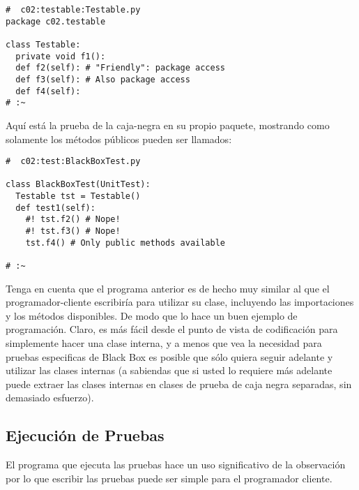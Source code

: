 \begin{lstlisting}
#  c02:testable:Testable.py 
package c02.testable 

class Testable: 
  private void f1(): 
  def f2(self): # "Friendly": package access 
  def f3(self): # Also package access 
  def f4(self): 
# :~ 
\end{lstlisting}

Aquí está la prueba de la caja-negra en su propio paquete, mostrando como solamente los métodos públicos pueden ser llamados:   \newline  \newline

\begin{lstlisting}
#  c02:test:BlackBoxTest.py 

class BlackBoxTest(UnitTest): 
  Testable tst = Testable() 
  def test1(self): 
    #! tst.f2() # Nope! 
    #! tst.f3() # Nope! 
    tst.f4() # Only public methods available 
    
# :~ 
\end{lstlisting}

Tenga en cuenta que el programa anterior es de hecho muy similar al que el programador-cliente escribiría para utilizar su clase, incluyendo las importaciones y los métodos disponibles. De modo que lo hace un buen ejemplo de programación. Claro, es más fácil desde el punto de vista de codificación para simplemente hacer una clase interna, y a menos que vea la necesidad para pruebas especificas de Black Box es posible que sólo quiera seguir adelante y utilizar las clases internas (a sabiendas que si usted lo requiere más adelante puede extraer las clases internas en clases de prueba de caja negra separadas, sin demasiado esfuerzo).

\subsection*{Ejecución de Pruebas}
\label{subsec:edp}


El programa que ejecuta las pruebas hace un uso significativo de la observación por lo que escribir las pruebas puede ser simple para el programador cliente.    \newline

